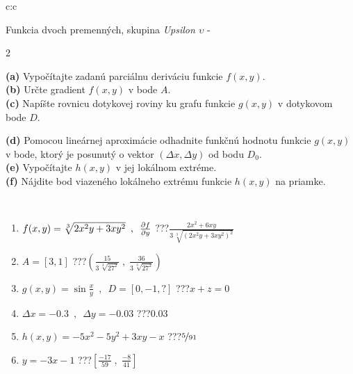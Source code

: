 \documentclass[10pt]{report}
\begin{document}
\begin{tabular}{c:c}
\begin{minipage}[c][104.5mm][t]{0.5\linewidth}
\begin{center}
\vspace{7mm}
{\huge \LARGE Funkcia dvoch premenných, skupina \textit{Upsilon $\upsilon$} -}\\[5mm]
\begin{minipage}{0.95\linewidth}
\begin{center}
{\small \begin{multicols}{2} \raggedright
\textbf{(a)} Vypočítajte zadanú parciálnu deriváciu funkcie \(f(x,y)\). \\[1mm]
\textbf{(b)} Určte gradient \(f(x,y)\) v bode \(A\). \\[1mm]
\textbf{(c)} Napíšte rovnicu dotykovej roviny ku grafu funkcie \(g(x,y)\) v dotykovom bode \(D\). \par \columnbreak
\textbf{(d)} Pomocou lineárnej aproximácie odhadnite funkčnú hodnotu funkcie \(g(x,y)\) v bode, ktorý je posunutý o vektor \((\Delta x, \Delta y)\) od bodu \(D_0\). \\[1mm]
\textbf{(e)} Vypočítajte \(h(x,y)\) v jej lokálnom extréme. \\[1mm]
\textbf{(f)} Nájdite bod viazeného lokálneho extrému funkcie \(h(x,y)\) na priamke. \\[1mm]
\end{multicols}
}
\end{center}
\end{minipage}
\\[4mm]
\begin{minipage}{0.79\linewidth}
\begin{center}
\begin{varwidth}{\linewidth}
\begin{enumerate}
\normalsizerr
\item $f(x,y) = \sqrt[3]{2x^2y + 3xy^2}\enspace , \enspace \pdv{f}{y}$\quad \dotfill\; ???\;\dotfill \quad $\frac{2x^2+6xy}{3\,\sqrt[3]{(2x^2y+3xy^2)^{2}}}$
\item $A = [3, 1]$\quad \dotfill\; ???\;\dotfill \quad $\left( \frac{15}{3\,\sqrt[3]{27^2}} \;,\; \frac{36}{3\,\sqrt[3]{27^2}} \right)$
\item $g(x,y) = \sin\frac{x}{y} \enspace , \enspace D = [0, -1, ?]$\quad \dotfill\; ???\;\dotfill \quad $x+z=0$
\item $\Delta x = {-0.3} \enspace,\enspace \Delta y = {-0.03}$\quad \dotfill\; ???\;\dotfill \quad $0.03$
\item $h(x,y) = -5x^2-5y^2+3xy-x$\quad \dotfill\; ???\;\dotfill \quad $\nicefrac{5}{91}$
\item $y = -3x-1$\quad \dotfill\; ???\;\dotfill \quad $\left[\frac{-17}{59}\;,\;\frac{-8}{41}\right]$

\end{enumerate}
\end{varwidth}
\end{center}
\end{minipage}
\end{center}
\end{minipage}
\end{tabular}
\end{document}
